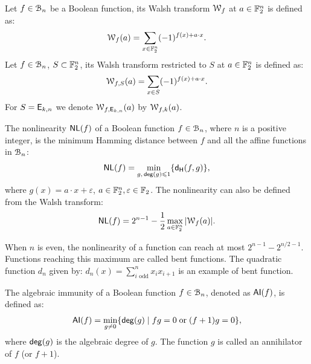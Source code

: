 \documentclass[11pt]{llncs}
\begin{document}
\begin{definition}\label{def:walsh_transform}
	Let $f\in \mathcal{B}_{n}$ be a Boolean function, its Walsh transform $\mathcal W_{f}$ at $a \in \mathbb{F}_2^n$ is defined as:
	\[  \mathcal W_{f} (a) = \sum_{x \in \mathbb{F}_2^n} (-1)^{f(x) +  a \cdot x }.\]
	Let $f\in \mathcal{B}_{n}$, $S \subset \mathbb{F}_2^n$, its Walsh transform restricted to $S$ at $a \in \mathbb{F}_2^n$ is defined as:
	\[  \mathcal W_{f,S} (a) = \sum_{x\in S} (-1)^{f(x)+a \cdot x}.\]
	For $S=\mathsf{E}_{k,n}$ we denote $\mathcal W_{f,\mathsf{E}_{k,n}} (a)$ by $\mathcal{W}_{f,k}(a)$.%
\end{definition}


	


\begin{definition}[Nonlinearity]%
	\label{def:nl}
	The nonlinearity $\mathsf{NL}(f)$ of a Boolean function $f\in \mathcal{B}_n$, where $n$ is a positive integer, is the minimum Hamming distance between $f$ and all the affine functions in $\mathcal{B}_n$:
	\[ \mathsf{NL}(f) = \min_{g,\, \mathsf{deg}(g)\leqslant 1} \{ \mathsf{d_H}(f,g) \}{,} \]
	where $g(x)=a\cdot x+\varepsilon$, $a\in \mathbb{F}_2^n, \varepsilon\in \mathbb{F}_2$. 	
	The nonlinearity can also be defined from the Walsh transform:
	\[ \mathsf{NL}(f) = 2^{n-1}- \frac{1}{2} \max_{a\in \mathbb{F}_2^n}{|\mathcal W_{f}(a)|}. \]
\end{definition}

When $n$ is even, the nonlinearity of a function can reach at most $2^{n-1}-2^{n/2 -1}$. Functions reaching this maximum are called bent functions. The quadratic function $d_n$ given by: $d_n(x)=\sum_{i \text{ odd}}^n x_i x_{i+1}$ is an example of bent function.






\begin{definition} \label{def:ai}
	The algebraic immunity of a Boolean function $f\in \mathcal{B}_{n}$, denoted as $\mathsf{AI}(f)$, is defined as:
	\[ \mathsf{AI}(f) = \min_{g \neq 0}\{ \mathsf{deg}(g) \; | \; fg = 0 \; \text{or} \; (f + 1)g = 0 \}{,} \]
	where $\mathsf{deg}(g)$ is the algebraic degree of $g$.
	The function $g$ is called an annihilator of $f$ (or $f + 1$). 
\end{definition}
\end{document}
